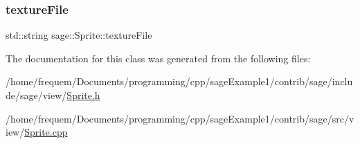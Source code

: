 \mbox{\label{classsage_1_1Sprite_a3ad65ff16f4f98a15f52092b1542838b}} 
\subsubsection{\texorpdfstring{textureFile}{textureFile}}
{\footnotesize\ttfamily std\+::string sage\+::\+Sprite\+::texture\+File\hspace{0.3cm}{\ttfamily [private]}}



The documentation for this class was generated from the following files\+:\begin{DoxyCompactItemize}
\item 
/home/frequem/\+Documents/programming/cpp/sage\+Example1/contrib/sage/include/sage/view/\mbox{\hyperlink{Sprite_8h}{Sprite.\+h}}\item 
/home/frequem/\+Documents/programming/cpp/sage\+Example1/contrib/sage/src/view/\mbox{\hyperlink{Sprite_8cpp}{Sprite.\+cpp}}\end{DoxyCompactItemize}
